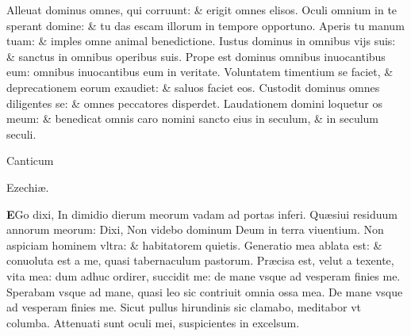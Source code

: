 \documentclass[a5paper,10pt]{book}
\def\ae{æ}
\begin{document}
\begin{multicols*}{2}
\newline \color{red} A\color{black}lleuat dominus omnes, qui corruunt: \& erigit omnes elisos.
\newline \color{red} O\color{black}culi omnium in te sperant domine: \& tu das escam illorum in tempore opportuno.
\newline \color{red} A\color{black}peris tu manum tuam: \& imples omne animal benedictione.
\newline \color{red} I\color{black}ustus dominus in omnibus vijs suis: \& sanctus in omnibus operibus suis.
\newline \color{red} P\color{black}rope est dominus omnibus inuocantibus eum: omnibus inuocantibus eum in veritate.
\newline \color{red} V\color{black}oluntatem timentium se faciet, \& deprecationem eorum exaudiet: \& saluos faciet eos.
\newline \color{red} C\color{black}ustodit dominus omnes diligentes se: \& omnes peccatores disperdet.
\newline \color{red} L\color{black}audationem domini loquetur os meum: \& benedicat omnis caro nomini sancto eius in seculum, \& in seculum seculi.
\vspace{-1em}
\begin{center} \color{red}
\hypertarget{Ezekiel}{Canticum} Ezechi\ae .
\end{center}
\vspace{-1em}
\lettrine[lines=2]{\bfseries \color{red} E}{}Go dixi, In dimidio dierum meorum vadam ad portas inferi.
\newline \color{red} Q\color{black}u\ae siui residuum annorum meorum: Dixi, Non videbo dominum Deum in terra viuentium.
\newline \color{red} N\color{black}on aspiciam hominem vltra: \& habitatorem quietis.
\newline \color{red} G\color{black}eneratio mea ablata est: \& conuoluta est a me, quasi tabernaculum pastorum.
\newline \color{red} P\color{black}r\ae cisa est, velut a texente, vita mea: dum adhuc ordirer, succidit me: de mane vsque ad vesperam finies me.
\newline \color{red} S\color{black}perabam vsque ad mane, quasi leo sic contriuit omnia ossa mea.
\newline \color{red} D\color{black}e mane vsque ad vesperam finies me. Sicut pullus hirundinis sic clamabo, meditabor vt columba.
\newline \color{red} A\color{black}ttenuati sunt oculi mei, suspicientes in excelsum.

\end{multicols*}
\end{document}
